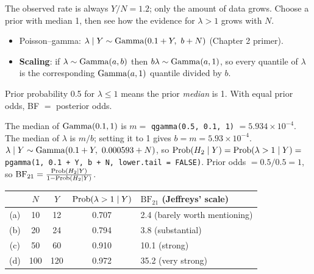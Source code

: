 \documentclass[11pt]{article}
\begin{document}
\begin{restate}
The observed rate is always $Y/N=1.2$; only the amount of data grows. Choose a prior with median 1, then see how the evidence for $\lambda>1$ grows with $N$.
\end{restate}

\begin{recall}
\begin{itemize}
\item Poisson--gamma: $\lambda\mid Y\sim\mathrm{Gamma}(0.1+Y,\ b+N)$ (Chapter 2 primer).
\item \textbf{Scaling}: if $\lambda\sim\mathrm{Gamma}(a,b)$ then $b\lambda\sim\mathrm{Gamma}(a,1)$, so every quantile of $\lambda$ is the corresponding $\mathrm{Gamma}(a,1)$ quantile divided by $b$.
\end{itemize}
\end{recall}

\begin{keyidea}
Prior probability 0.5 for $\lambda\le1$ means the prior \emph{median} is 1. With equal prior odds, BF $=$ posterior odds.
\end{keyidea}

\solution
{}
The median of $\mathrm{Gamma}(0.1,1)$ is $m=$ \texttt{qgamma(0.5, 0.1, 1)} $=5.934\times10^{-4}$. The median of $\lambda$ is $m/b$; setting it to 1 gives $b=m=5.93\times10^{-4}$.
 $\lambda\mid Y\sim\dist{Gamma}(0.1+Y,\ 0.000593+N)$, so
$\mathrm{Prob}(H_2\mid Y)=\mathrm{Prob}(\lambda>1\mid Y)=$ \texttt{pgamma(1, 0.1 + Y, b + N, lower.tail = FALSE)}.
 Prior odds $=0.5/0.5=1$, so $\text{BF}_{21}=\frac{\mathrm{Prob}(H_2\mid Y)}{1-\mathrm{Prob}(H_2\mid Y)}$.
\begin{center}
\begin{tabular}{ccccl}\toprule
 & $N$ & $Y$ & $\mathrm{Prob}(\lambda>1\mid Y)$ & $\text{BF}_{21}$ (Jeffreys' scale)\\\midrule
(a) & 10 & 12 & 0.707 & 2.4 (barely worth mentioning)\\
(b) & 20 & 24 & 0.794 & 3.8 (substantial)\\
(c) & 50 & 60 & 0.910 & 10.1 (strong)\\
(d) & 100 & 120 & 0.972 & 35.2 (very strong)\\\bottomrule
\end{tabular}
\end{center}
\end{document}
